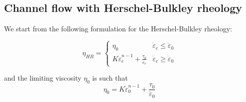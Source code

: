 \newpage
\subsection{Channel flow with Herschel-Bulkley rheology \label{ss:HBflow}}

We start from the following formulation for the Herschel-Bulkley rheology:
\begin{mdframed}[backgroundcolor=blue!5]
\[
\eta_{HB}
=
\left\{
\begin{array}{lc}
\eta_0 & \dot{\varepsilon}_e\leq \dot{\varepsilon}_0 \\
K  \dot{\varepsilon}_e^{n-1} + \frac{\tau_0}{\dot{\varepsilon}_e}  
& \dot{\varepsilon}_e\geq \dot{\varepsilon}_0 
\end{array}
\right.
\]
\end{mdframed}
and the limiting viscosity $\eta_0$ is such that 
\[
\eta_0 = K  \dot{\varepsilon}_0^{n-1} + \frac{\tau_0}{\dot{\varepsilon}_0}  
\]

